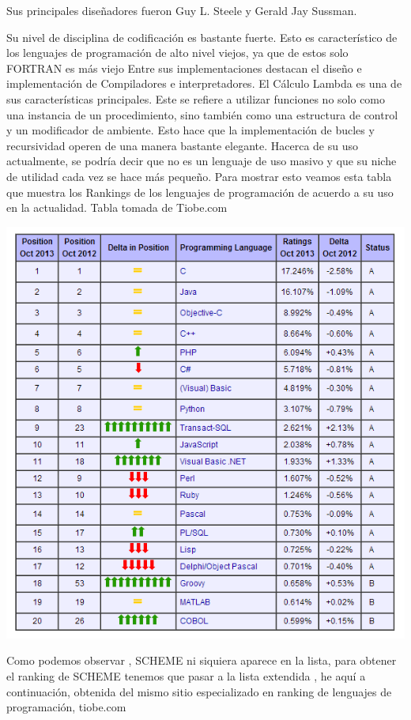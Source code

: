\documentclass[11pt]{article} %
\begin{document}
Sus principales diseñadores fueron Guy L. Steele y Gerald Jay Sussman.

Su nivel de disciplina de codificación es bastante fuerte. Esto es característico de los lenguajes de programación de alto nivel viejos, ya que de estos solo FORTRAN es más viejo
Entre sus implementaciones destacan el diseño e implementación de Compiladores e interpretadores.
El Cálculo Lambda es una de sus características principales. Este se refiere a utilizar funciones no solo como una instancia de un procedimiento, sino también como una estructura de control y un modificador de ambiente. Esto hace que la implementación de bucles y recursividad operen de una manera bastante elegante.
Hacerca de su uso actualmente, se podría decir que no es un lenguaje de uso masivo y que su niche de utilidad cada vez se hace más pequeño. Para mostrar esto veamos esta tabla que muestra los Rankings de los lenguajes de programación de acuerdo a su uso en la actualidad. Tabla tomada de Tiobe.com

\includegraphics[width=14cm]{ranking.png}

Como podemos observar , SCHEME ni siquiera aparece en la lista, para obtener el ranking de SCHEME tenemos que pasar a la lista extendida , he aquí a continuación, obtenida del mismo sitio especializado en ranking de lenguajes de programación, tiobe.com
\end{document}
